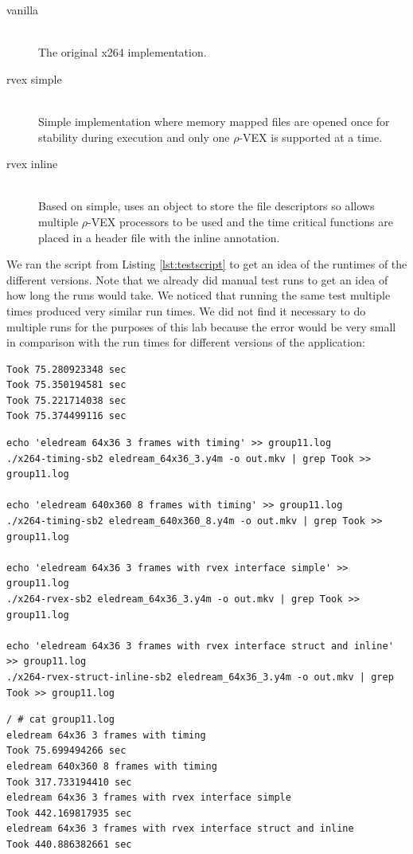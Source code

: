 \documentclass{article}
\newcommand{\rvex}{\ensuremath{\rho}-VEX}
\begin{document}
\begin{description}
    \item[vanilla] \hfill \\
        The original x264 implementation. 
    \item[rvex simple] \hfill \\
        Simple implementation where memory mapped files are opened once for stability during execution and only one \rvex{} is supported at a time. 
    \item[rvex inline] \hfill \\
        Based on simple, uses an object to store the file descriptors so allows multiple \rvex{} processors to be used and the time critical functions are placed in a header file with the inline annotation. 
\end{description}

We ran the script from Listing \ref{lst:testscript} to get an idea of the runtimes of the different versions. 
Note that we already did manual test runs to get an idea of how long the runs would take. 
We noticed that running the same test multiple times produced very similar run times. 
We did not find it necessary to do multiple runs for the purposes of this lab because the error would be very small in comparison with the run times for different versions of the application:

\begin{lstlisting}
Took 75.280923348 sec
Took 75.350194581 sec
Took 75.221714038 sec
Took 75.374499116 sec
\end{lstlisting}

\begin{lstlisting}[style=bash,caption=Test script,label=lst:testscript]
echo 'eledream 64x36 3 frames with timing' >> group11.log
./x264-timing-sb2 eledream_64x36_3.y4m -o out.mkv | grep Took >> group11.log

echo 'eledream 640x360 8 frames with timing' >> group11.log
./x264-timing-sb2 eledream_640x360_8.y4m -o out.mkv | grep Took >> group11.log

echo 'eledream 64x36 3 frames with rvex interface simple' >> group11.log
./x264-rvex-sb2 eledream_64x36_3.y4m -o out.mkv | grep Took >> group11.log

echo 'eledream 64x36 3 frames with rvex interface struct and inline' >> group11.log
./x264-rvex-struct-inline-sb2 eledream_64x36_3.y4m -o out.mkv | grep Took >> group11.log
\end{lstlisting}

\begin{lstlisting}[caption=Test output,label=lst:testoutput]
/ # cat group11.log
eledream 64x36 3 frames with timing
Took 75.699494266 sec
eledream 640x360 8 frames with timing
Took 317.733194410 sec
eledream 64x36 3 frames with rvex interface simple
Took 442.169817935 sec
eledream 64x36 3 frames with rvex interface struct and inline
Took 440.886382661 sec
\end{lstlisting}
\end{document}
